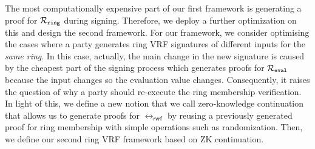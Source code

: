 The most computationally expensive part of our first framework is generating a proof for $ \mathcal{R}_{\mathtt{ring}} $ during signing. Therefore, we deploy a further optimization on this and design the second framework. For our framework,  we consider optimising the cases where a party generates ring VRF signatures of different inputs for the \emph{same ring}. In this case, actually, the main change in the new signature is caused by the cheapest part of the signing process which generates proofs for $ \mathcal{R}_{\mathtt{eval}}  $ because the input changes so the evaluation value changes. Consequently, it raises the question of why a party should re-execute the ring membership verification.  In light of this, we define a new notion that we call zero-knowledge continuation that allows us to generate proofs for $ \rel_{\mathsf{rvrf}} $ by reusing a previously generated proof for ring membership with simple operations such as randomization. Then, we define our second ring VRF framework based on ZK continuation.


%


%

